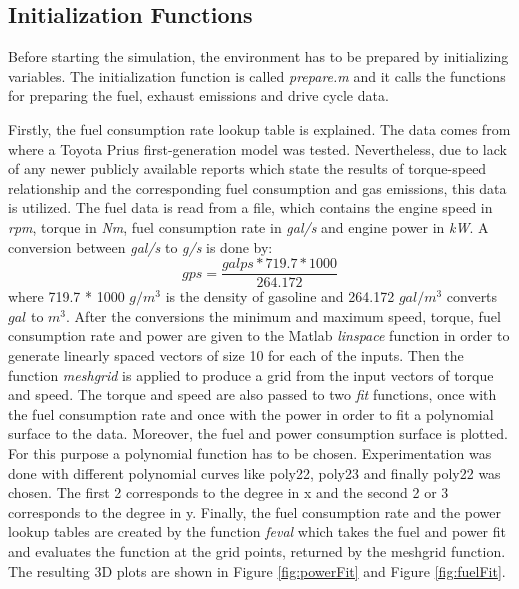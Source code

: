 \subsection{Initialization Functions}
\label{sec:initfunc}
Before starting the simulation, the environment has to be prepared by initializing variables. The initialization function is called \textit{prepare.m} and it calls the functions for preparing the fuel, exhaust emissions and drive cycle data. 

Firstly, the fuel consumption rate lookup table is explained. The data comes from \citet{argonne1999} where a Toyota Prius first-generation model was tested. Nevertheless, due to lack of any newer publicly available reports which state the results of torque-speed relationship and the corresponding fuel consumption and gas emissions, this data is utilized. The fuel data is read from a file, which contains the engine speed in \textit{rpm}, torque in \textit{Nm}, fuel consumption rate in \textit{gal/s} and engine power in \textit{kW}.  A conversion between \textit{gal/s} to \textit{g/s} is done by:
\begin{equation}
gps = \frac{galps * 719.7 * 1000}{264.172}
\end{equation}
where 719.7 * 1000 $g/m^3$ is the density of gasoline and 264.172 $gal/m^3$ converts $gal$ to $m^3$. After the conversions the minimum and maximum speed, torque, fuel consumption rate and power are given to the Matlab \textit{linspace} function in order to generate linearly spaced vectors of size 10 for each of the inputs. Then the function \textit{meshgrid} is applied to produce a grid from the input vectors of torque and speed. The torque and speed are also passed to two \textit{fit} functions, once with the fuel consumption rate and once with the power in order to fit a polynomial surface to the data. Moreover, the fuel and power consumption surface is plotted. For this purpose a polynomial function has to be chosen. Experimentation was done with different polynomial curves like poly22, poly23 and finally poly22 was chosen. The first 2 corresponds to the degree in x and the second 2 or 3 corresponds to the degree in y. Finally, the fuel consumption rate and the power lookup tables are created by the function \textit{feval} which takes the fuel and power fit and evaluates the function at the grid points, returned by the meshgrid function. The resulting 3D plots are shown in Figure \ref{fig:powerFit} and Figure \ref{fig:fuelFit}.


